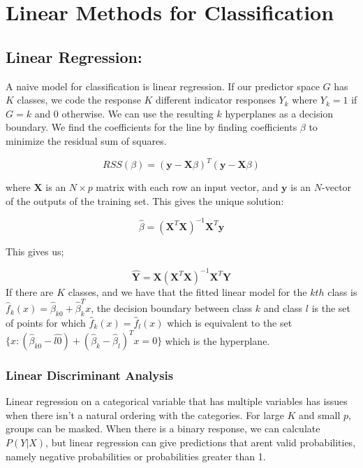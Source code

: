\documentclass[12pt,twoside]{reedthesis}
\theoremstyle{definition}
\theoremstyle{definition}
\theoremstyle{definition}
\theoremstyle{remark}
\begin{document}
\section{Linear Methods for
Classification}\label{linear-methods-for-classification}

\subsection{Linear Regression:}\label{linear-regression}

A naive model for classification is linear regression. If our predictor
space \(G\) has \(K\) classes, we code the response \(K\) different
indicator responses \(Y_k\) where \(Y_k = 1\) if \(G = k\) and 0
otherwise. We can use the resulting \(k\) hyperplanes as a decision
boundary. We find the coefficients for the line by finding coefficients
\(\beta\) to minimize the residual sum of squares.

\[ RSS(\beta) = (\textbf{y} - \textbf{X}\beta)^T(\textbf{y} - \textbf{X}\beta) \]

where \(\textbf{X}\) is an \(N\times p\) matrix with each row an input
vector, and \(\textbf{y}\) is an \(N\)-vector of the outputs of the
training set. This gives the unique solution:

\[ \hat{\beta} = (\textbf{X}^T\textbf{X})^{-1}\textbf{X}^T\textbf{y}\]

This gives us;

\[\hat{\textbf{Y}} = \textbf{X}(\textbf{X}^T\textbf{X})^{-1}\textbf{X}^T
\textbf{Y}\] If there are \(K\) classes, and we have that the fitted
linear model for the \(kth\) class is
\(\hat{f}_k(x) = \hat{\beta}_{k0} + \hat{\beta}^T_kx\), the decision
boundary between class \(k\) and class \(l\) is the set of points for
which \(\hat{f}_k(x) = \hat{f}_l(x)\) which is equivalent to the set
\(\{x: (\hat{\beta}_{k0} - \hat{l0}) + (\hat{\beta}_k - \hat{\beta}_l)^Tx = 0\}\)
which is the hyperplane.

\subsubsection{Linear Discriminant
Analysis}\label{linear-discriminant-analysis}

Linear regression on a categorical variable that has multiple variables
has issues when there isn't a natural ordering with the categories. For
large \(K\) and small \(p\), groups can be masked. When there is a
binary response, we can calculate \(P(Y|X)\), but linear regression can
give predictions that arent valid probabilities, namely negative
probabilities or probabilities greater than 1.
\end{document}
